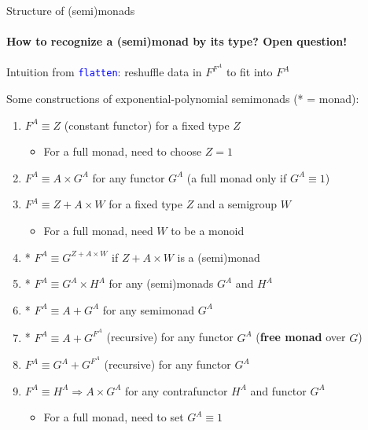 \documentclass[english]{beamer}
\begin{document}
\begin{frame}{Structure of (semi)monads}


\framesubtitle{How to recognize a (semi)monad by its type? Open question!}

Intuition from \texttt{\textcolor{blue}{\footnotesize{}flatten}}:
reshuffle data in $F^{F^{A}}$ to fit into $F^{A}$

Some constructions of exponential-polynomial semimonads ({*} = monad):
\begin{enumerate}
\item $F^{A}\equiv Z$ (constant functor) for a fixed type $Z$
\begin{itemize}
\item For a full monad, need to choose $Z=1$ 
\end{itemize}
\item $F^{A}\equiv A\times G^{A}$ for any functor $G^{A}$ (a full monad
only if $G^{A}\equiv1$)
\item $F^{A}\equiv Z+A\times W$ for a fixed type $Z$ and a semigroup $W$
\begin{itemize}
\item For a full monad, need $W$ to be a monoid
\end{itemize}
\item {*} $F^{A}\equiv G^{Z+A\times W}$ if $Z+A\times W$ is a (semi)monad
\item {*} $F^{A}\equiv G^{A}\times H^{A}$ for any (semi)monads $G^{A}$
and $H^{A}$
\item {*} $F^{A}\equiv A+G^{A}$ for any semimonad $G^{A}$
\item {*} $F^{A}\equiv A+G^{F^{A}}$ (recursive) for any functor $G^{A}$
(\textbf{free monad} over $G$)
\item $F^{A}\equiv G^{A}+G^{F^{A}}$ (recursive) for any functor $G^{A}$
\item $F^{A}\equiv H^{A}\Rightarrow A\times G^{A}$ for any contrafunctor
$H^{A}$ and functor $G^{A}$
\begin{itemize}
\item For a full monad, need to set $G^{A}\equiv1$
\end{itemize}
\end{enumerate}
\end{frame}
\end{document}
